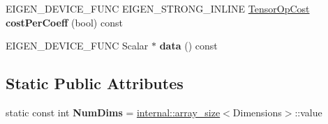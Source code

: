 \begin{DoxyCompactItemize}
\item 
\mbox{\label{struct_eigen_1_1_tensor_evaluator_3_01const_01_tensor_generator_op_3_01_generator_00_01_arg_type_01_4_00_01_device_01_4_ac18fe15cee80407a1a1f350c969d3fe4}} 
E\+I\+G\+E\+N\+\_\+\+D\+E\+V\+I\+C\+E\+\_\+\+F\+U\+NC E\+I\+G\+E\+N\+\_\+\+S\+T\+R\+O\+N\+G\+\_\+\+I\+N\+L\+I\+NE \hyperlink{class_eigen_1_1_tensor_op_cost}{Tensor\+Op\+Cost} {\bfseries cost\+Per\+Coeff} (bool) const
\item 
\mbox{\label{struct_eigen_1_1_tensor_evaluator_3_01const_01_tensor_generator_op_3_01_generator_00_01_arg_type_01_4_00_01_device_01_4_a3a9bc7f34ee4521a257dff832dd400af}} 
E\+I\+G\+E\+N\+\_\+\+D\+E\+V\+I\+C\+E\+\_\+\+F\+U\+NC Scalar $\ast$ {\bfseries data} () const
\end{DoxyCompactItemize}
\subsection*{Static Public Attributes}
\begin{DoxyCompactItemize}
\item 
\mbox{\label{struct_eigen_1_1_tensor_evaluator_3_01const_01_tensor_generator_op_3_01_generator_00_01_arg_type_01_4_00_01_device_01_4_a7381e06522f2142ce60abe9e8b300065}} 
static const int {\bfseries Num\+Dims} = \hyperlink{struct_eigen_1_1internal_1_1array__size}{internal\+::array\+\_\+size}$<$Dimensions$>$\+::value
\end{DoxyCompactItemize}

